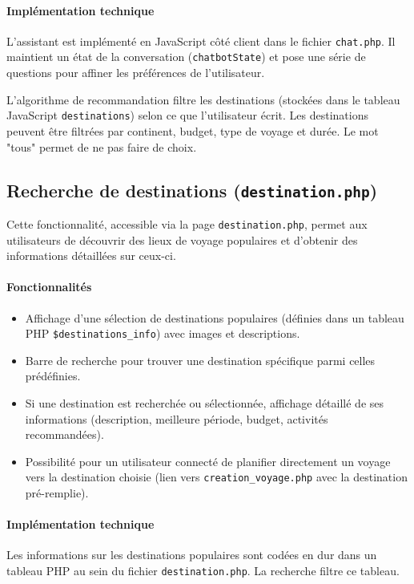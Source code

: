 \documentclass[a4paper,12pt]{article}
\begin{document}
\paragraph{Implémentation technique}
L’assistant est implémenté en JavaScript côté client dans le fichier \texttt{chat.php}. Il maintient un état de la conversation (\texttt{chatbotState}) et pose une série de questions pour affiner les préférences de l'utilisateur.

L'algorithme de recommandation filtre les destinations (stockées dans le tableau JavaScript \texttt{destinations}) selon ce que l'utilisateur écrit. Les destinations peuvent être filtrées par continent, budget, type de voyage et durée. Le mot "tous" permet de ne pas faire de choix.

\subsection{Recherche de destinations (\texttt{destination.php})}

Cette fonctionnalité, accessible via la page \texttt{destination.php}, permet aux utilisateurs de découvrir des lieux de voyage populaires et d’obtenir des informations détaillées sur ceux-ci.

\paragraph{Fonctionnalités}
\begin{itemize}
  \item Affichage d'une sélection de destinations populaires (définies dans un tableau PHP \texttt{\$destinations\_info}) avec images et descriptions.
  \item Barre de recherche pour trouver une destination spécifique parmi celles prédéfinies.
  \item Si une destination est recherchée ou sélectionnée, affichage détaillé de ses informations (description, meilleure période, budget, activités recommandées).
  \item Possibilité pour un utilisateur connecté de planifier directement un voyage vers la destination choisie (lien vers \texttt{creation\_voyage.php} avec la destination pré-remplie).
\end{itemize}

\paragraph{Implémentation technique}
Les informations sur les destinations populaires sont codées en dur dans un tableau PHP au sein du fichier \texttt{destination.php}. La recherche filtre ce tableau.
\end{document}
